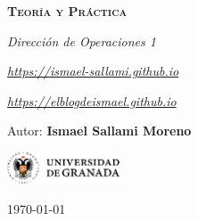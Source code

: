 \documentclass[12pt]{report} %
\begin{document}
\begin{titlepage}
    \begin{center}
        \vspace*{2cm}
        
        {\Huge \bfseries\scshape Teoría y Práctica \par}
        \vspace{0.5cm}
        {\Large \itshape Dirección de Operaciones 1 \par}
        \vspace{0.5cm}
        {\small \itshape \href{https://ismael-sallami.github.io}{https://ismael-sallami.github.io} \par}
        {\small \itshape \href{https://elblogdeismael.github.io}{https://elblogdeismael.github.io} \par}


        \vfill
        
        {\LARGE Autor: \textbf{Ismael Sallami Moreno} \par}
        \vspace{0.3cm}
        
        \vspace{1cm}
        \includegraphics[width=0.25\textwidth]{../../../extraFiles/img/ugr.png} %
        \vspace{1cm}
        
        {\large \today}
    \end{center}
    
    \restoregeometry
\end{titlepage}


\thispagestyle{empty} %
\clearpage

\tableofcontents
\listoffigures
\clearpage

\listoftables
\clearpage
\thispagestyle{empty} %
\clearpage

\renewcommand{\lstlistlistingname}{Índice de Código}
\lstlistoflistings
\clearpage

\renewcommand{\listtheoremname}{Índice de Ecuaciones}
\listoftheorems[ignoreall,show={equation}]
\clearpage
\end{document}
